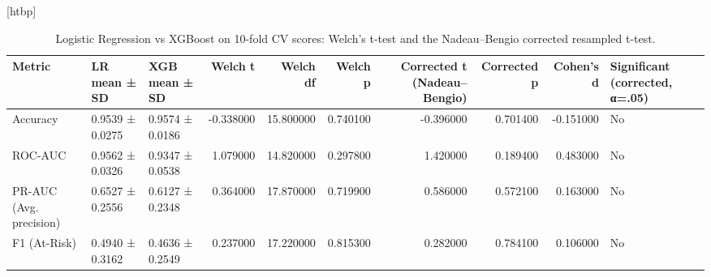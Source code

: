 \begin{table}
\small[htbp]
\caption{Logistic Regression vs XGBoost on 10-fold CV scores: Welch's t-test and the Nadeau–Bengio corrected resampled t-test.}
\label{tab:T08_lr_vs_xgb}
\begin{tabular}{lllrrrrrrl}
\toprule
Metric & LR mean ± SD & XGB mean ± SD & Welch t & Welch df & Welch p & Corrected t (Nadeau–Bengio) & Corrected p & Cohen's d & Significant (corrected, α=.05) \\
\midrule
Accuracy & 0.9539 ± 0.0275 & 0.9574 ± 0.0186 & -0.338000 & 15.800000 & 0.740100 & -0.396000 & 0.701400 & -0.151000 & No \\
ROC-AUC & 0.9562 ± 0.0326 & 0.9347 ± 0.0538 & 1.079000 & 14.820000 & 0.297800 & 1.420000 & 0.189400 & 0.483000 & No \\
PR-AUC (Avg. precision) & 0.6527 ± 0.2556 & 0.6127 ± 0.2348 & 0.364000 & 17.870000 & 0.719900 & 0.586000 & 0.572100 & 0.163000 & No \\
F1 (At-Risk) & 0.4940 ± 0.3162 & 0.4636 ± 0.2549 & 0.237000 & 17.220000 & 0.815300 & 0.282000 & 0.784100 & 0.106000 & No \\
\bottomrule
\end{tabular}
\end{table}
